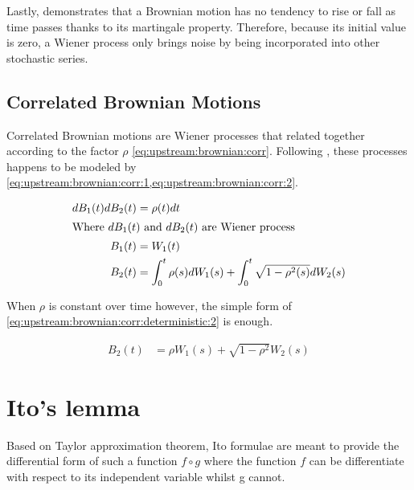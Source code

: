 \documentclass[12pt]{report}
\begin{document}
Lastly, \citet{shreve} demonstrates that a Brownian motion has no tendency to rise or fall as time passes thanks to its martingale property. Therefore, because its initial value is zero, a Wiener process only brings noise by being incorporated into other stochastic series.

\subsection{Correlated Brownian Motions}
\label{sub:upstream:brownian:correlated}

Correlated Brownian motions are Wiener processes that related together according to the factor $\rho$ \cref{eq:upstream:brownian:corr}.
Following \citet{shreve}, these processes happens to be modeled by \cref{eq:upstream:brownian:corr:1,eq:upstream:brownian:corr:2}.

\begin{align}
  dB_1(t) dB_2(t) &= \rho(t) dt \label{eq:upstream:brownian:corr} \\
  \intertext{Where $dB_1(t)$ and $dB_2(t)$ are Wiener process }
  B_1(t) &= W_1(t) \label{eq:upstream:brownian:corr:1} \\
  B_2(t) &= \int_0^t \rho(s) dW_1(s) + \int_0^t \sqrt{1 - \rho^2(s)} dW_2(s) \label{eq:upstream:brownian:corr:2}
\end{align}

When $\rho$ is constant over time however, the simple form of \cref{eq:upstream:brownian:corr:deterministic:2} is enough.

\begin{align}
B_2(t) &= \rho W_1(s) + \sqrt{1 - \rho^2} W_2(s) \label{eq:upstream:brownian:corr:deterministic:2}
\end{align}


\section{Ito's lemma}
\label{sec:upstream:ito}

Based on Taylor approximation theorem, Ito formulae are meant to provide the differential form of such a function $f \circ g$ where the function $f$ can be differentiate with respect to its independent variable whilst g cannot.
\end{document}

